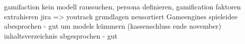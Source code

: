 gamifaction kein modell raussuchen,
	persona definieren, gamification faktoren extrahieren
jira => youtrack
grundlagen neusortiert
Gameengines
spieleidee abesprochen - gut
um models kümmern (kassenschluss ende november)
inhaltsverzeichnis abgesprochen - gut
